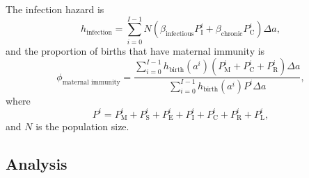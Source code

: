 \documentclass[12pt]{article}
\begin{document}
The infection hazard is
\begin{equation}
  h_{\text{infection}}
  = \sum_{i = 0}^{I - 1} N
  \left(
    \beta_{\text{infectious}} P_{\mathrm{I}}^i
    + \beta_{\text{chronic}} P_{\mathrm{C}}^i
  \right)
  \Delta a,
\end{equation}
and the proportion of births that have maternal immunity is
\begin{equation}
  \phi_{\text{maternal immunity}}
  = \frac{
    \sum_{i = 0}^{I - 1}
    h_{\text{birth}}(a^i) \left(
      P_{\mathrm{M}}^i + P_{\mathrm{C}}^i + P_{\mathrm{R}}^i
    \right)
    \Delta a
  }{
    \sum_{i = 0}^{I - 1} h_{\text{birth}}(a^i) P^i \Delta a
  },
\end{equation}
where
\begin{equation}
  P^i =  P_{\mathrm{M}}^i + P_{\mathrm{S}}^i + P_{\mathrm{E}}^i
  + P_{\mathrm{I}}^i + P_{\mathrm{C}}^i + P_{\mathrm{R}}^i + P_{\mathrm{L}}^i,
\end{equation}
and $N$ is the population size.

\subsection{Analysis}
\end{document}
